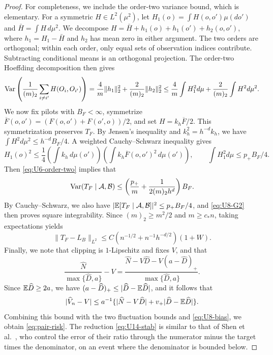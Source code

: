 \begin{proof}
For completeness, we include the order-two variance bound, which is
elementary. For a symmetric $H\in L^2(\mu^2)$, let
$H_1(o)=\int H(o,o')\mu(do')$ and $\bar H=\int H\,d\mu^2$. We decompose
$H=\bar H+h_1(o)+h_1(o')+h_2(o,o')$, where $h_1=H_1-\bar H$
and $h_2$ has mean zero in either argument. The two orders are
orthogonal; within each order, only equal sets of observation indices
contribute. Subtracting conditional means is an orthogonal projection.
The order-two Hoeffding decomposition \cite{Hoeffding1948} then gives
\begin{equation}\label{eq:U6-order-two}
 \operatorname{Var}\left(\frac1{(m)_2}\sum_{i\ne i'}H(O_i,O_{i'})\right)
 =\frac4m\|h_1\|_2^2+\frac2{(m)_2}\|h_2\|_2^2
 \le\frac4m\int H_1^2d\mu+\frac2{(m)_2}\int H^2d\mu^2.
\end{equation}
We now fix pilots with $B_F<\infty$, symmetrize
$\overline F(o,o')=(F(o,o')+F(o',o))/2$, and set
$H=k_h\overline F/2$. This symmetrization preserves $T_F$. By Jensen's
inequality and $k_h^2=h^{-d}k_h$, we have
$\int H^2d\mu^2\le h^{-d}B_F/4$. A weighted Cauchy--Schwarz
inequality gives
\[
 H_1(o)^2\le\frac14\left(\int k_h\,d\mu(o')\right)
                  \left(\int k_h\overline F(o,o')^2\,d\mu(o')\right),
 \qquad \int H_1^2d\mu\le p_+B_F/4.
\]
Then \eqref{eq:U6-order-two} implies that
\begin{equation}\label{eq:U11-pair-variance}
 \operatorname{Var}(T_F\mid\mathcal A,\mathcal B)
 \le\left(\frac{p_+}{m}+\frac1{2(m)_2h^d}\right)B_F.
\end{equation}
By Cauchy--Schwarz, we also have
$|\mathbb E[T_F\mid\mathcal A,\mathcal B]|^2\le p_+B_F/4$, and
\eqref{eq:U8-G2} then proves square integrability.
Since $(m)_2\ge m^2/2$ and $m\ge c_*n$, taking expectations yields
\begin{equation}\label{eq:U11-pair-fluctuation}
 \|T_F-L_B\|_{L^2}
 \le C(n^{-1/2}+n^{-1}h^{-d/2})(1+W).
\end{equation}
Finally, we note that clipping is $1$-Lipschitz and fixes $V$, and
that
\[
 \frac{\widehat N}{\max\{\widehat D,a\}}-V
 =\frac{\widehat N-V\widehat D-V(a-\widehat D)_+}
        {\max\{\widehat D,a\}}.
\]
Since $\mathbb E\widehat D\ge2a$, we have
$(a-\widehat D)_+\le|\widehat D-\mathbb E\widehat D|$, and it follows that
\begin{equation}\label{eq:U14-stab}
 |\widehat V_n-V|\le a^{-1}
 \{|\widehat N-V\widehat D|+v_+|\widehat D-\mathbb E\widehat D|\}.
\end{equation}
Combining this bound with the two fluctuation bounds and
\eqref{eq:U8-bias}, we obtain \eqref{eq:pair-risk}.
The reduction \eqref{eq:U14-stab} is similar to that of Shen et al.\
\cite[Appendix~A.1, equation~(28)]{ShenGaoWittenHan2020}, who control
the error of their ratio through the numerator minus the target times
the denominator, on an event where the denominator is bounded below.
\end{proof}

